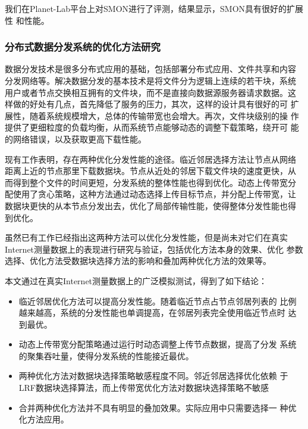我们在Planet-Lab平台上对SMON进行了评测，结果显示，SMON具有很好的扩展性
和性能。

\subsubsection*{分布式数据分发系统的优化方法研究}

数据分发技术是很多分布式应用的基础，包括部署分布式应用、文件共享和内容
分发网络等。解决数据分发的基本技术是将文件分为逻辑上连续的若干块，系统
用户或者节点交换相互拥有的文件块，而不是直接向数据源服务器请求数据。这
样做的好处有几点，首先降低了服务的压力，其次，这样的设计具有很好的可
扩展性，随着系统规模增大，总体的传输带宽也会增大。再次，文件块级别的操
作提供了更细粒度的负载均衡，从而系统节点能够动态的调整下载策略，绕开可
能的网络错误，以及获取更高下载性能。

现有工作表明，存在两种优化分发性能的途径。临近邻居选择方法让节点从网络
距离上近的节点那里下载数据块。节点从近处的邻居下载文件块的速度更快，从
而得到整个文件的时间更短，分发系统的整体性能也得到优化。动态上传带宽分
配使用了贪心策略，这种方法通过动态选择上传目标节点，并分配上传带宽，让
数据块更快的从本节点分发出去，优化了局部传输性能，使得整体分发性能也得
到优化。

虽然已有工作已经指出这两种方法可以优化分发性能，但是尚未对它们在真实
Internet测量数据上的表现进行研究与验证，包括优化方法本身的效果、优化
参数选择、优化方法受数据块选择方法的影响和叠加两种优化方法的效果等。


本文通过在真实Internet测量数据上的广泛模拟测试，得到了如下结论：

\begin{itemize}

  \item 临近邻居优化方法可以提高分发性能。随着临近节点占节点邻居列表的
  比例越来越高，系统的分发性能也单调提高，在邻居列表完全使用临近节点时
  达到最优。

  \item 动态上传带宽分配策略通过运行时动态调整上传节点数据，提高了分发
  系统的聚集吞吐量，使得分发系统的性能接近最优。

  \item 两种优化方法对数据块选择策略敏感程度不同。邻近邻居选择优化依赖
  于LRF数据块选择算法，而上传带宽优化方法对数据块选择策略不敏感

  \item 合并两种优化方法并不具有明显的叠加效果。实际应用中只需要选择一
  种优化方法应用。

\end{itemize}


